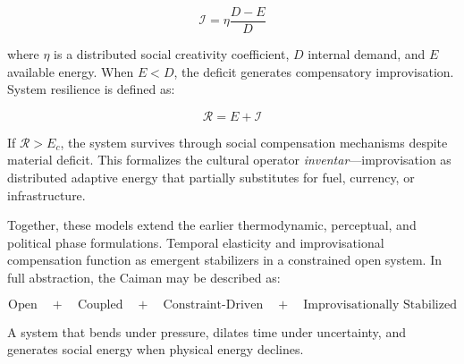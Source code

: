 \documentclass[12pt]{article}
\begin{document}
\[
\mathcal{I} = \eta \frac{D - E}{D}
\]

where \( \eta \) is a distributed social creativity coefficient, \( D \) internal demand, and \( E \) available energy. When \( E < D \), the deficit generates compensatory improvisation. System resilience is defined as:

\[
\mathcal{R} = E + \mathcal{I}
\]

If \( \mathcal{R} > E_c \), the system survives through social compensation mechanisms despite material deficit. This formalizes the cultural operator \textit{inventar}---improvisation as distributed adaptive energy that partially substitutes for fuel, currency, or infrastructure.

Together, these models extend the earlier thermodynamic, perceptual, and political phase formulations. Temporal elasticity and improvisational compensation function as emergent stabilizers in a constrained open system. In full abstraction, the Caiman may be described as:

\[
\text{Open} \quad + \quad \text{Coupled} \quad + \quad \text{Constraint-Driven} \quad + \quad \text{Improvisationally Stabilized}
\]

A system that bends under pressure, dilates time under uncertainty, and generates social energy when physical energy declines.
\end{document}
